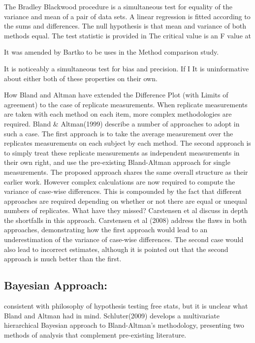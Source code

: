 The Bradley Blackwood procedure is a simultaneous test for equality of the variance and mean of a pair of data sets. 
A linear regression is fitted according to the sums and differences.
The null hypothesis is that mean and variance of both methods equal.
The test statistic is provided in 
The critical value is an F value at \alpha %





It was amended by Bartko to be uses in the Method comparison study.

It is noticeably a simultaneous test for bias and precision. If I It is uninformative about either both of these properties on their own.

\newpage
How Bland and Altman have extended the Difference Plot (with Limits of agreement) to the case of replicate measurements.
When replicate measurements are taken with each method on each item, more complex methodologies are required. Bland \& Altman(1999) describe a number of approaches to adopt in such a case. The first approach is to take the average measurement over the replicates measurements on each subject by each method.
The second approach is to simply treat these replicate measurements as independent measurements in their own right, and use the pre-existing Bland-Altman approach for single measurements.
The proposed approach shares the same overall structure as their earlier work. However complex calculations are now required to compute the variance of case-wise differences. This is compounded by the fact that different approaches are required depending on whether or not there are equal or unequal numbers of replicates.
What have they missed? Carstensen et al discuss in depth the shortfalls in this approach.
Carstensen et al (2008) address the flaws in both approaches, demonstrating how the first approach would lead to an underestimation of the variance of case-wise differences. The second case would also lead to incorrect estimates, although it is pointed out that the second approach is much better than the first.


\subsection*{Bayesian Approach: }
consistent with philosophy of hypothesis testing free stats, but it is unclear what Bland and Altman had in mind.
Schluter(2009) develops a multivariate hierarchical Bayesian approach to Bland-Altman’s methodology, presenting two methods of analysis that complement pre-existing literature. 


